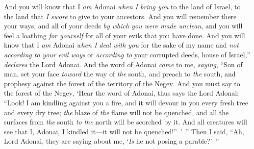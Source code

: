 \begin{biblechapter}
\verse And you will know that I \textit{am} Adonai \textit{when I bring you} to the land of Israel, to the land that \textit{I swore} to give to your ancestors.
\verse And you will remember there your ways, and all of your deeds \textit{by which you were made unclean}, and you will feel a loathing \textit{for yourself} for all of your evils that you have done.
\verse And you will know that I \textit{am} Adonai \textit{when I deal with you} for the sake of my name and \textit{not according to your evil ways} or \textit{according to} your corrupted deeds, house of Israel,” \textit{declares} the Lord Adonai.
\verse  And the word of Adonai \textit{came} to me, \textit{saying},
\verse “Son of man, set your face \textit{toward} the way of \textit{the} south, and preach to \textit{the} south, and prophesy against the forest of the territory of the Negev.
\verse And you must say to the forest of the Negev, ‘Hear the word of Adonai, thus says the Lord Adonai: “Look! I am kindling against you a fire, and it will devour in you every fresh tree and every dry tree; \textit{the} blaze of \textit{the} flame will not be quenched, and all the surfaces from \textit{the} south \textit{to} \textit{the} north will be scorched by it.
\verse And all creatures will see that I, Adonai, I kindled it—it will not be quenched!” ’ ”
\verse Then I said, “Ah, Lord Adonai, they are saying about me, ‘\textit{Is} he not posing a parable?’ ”
\end{biblechapter}

